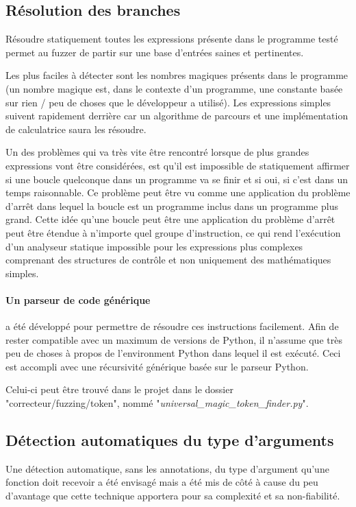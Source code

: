 \documentclass[a4paper]{report}
\begin{document}
\subsection{Résolution des branches}

Résoudre statiquement toutes les expressions présente dans le programme testé permet au fuzzer de partir sur une base d'entrées saines et pertinentes.

Les plus faciles à détecter sont les nombres magiques présents dans le programme (un nombre magique est, dans le contexte d'un programme, une constante basée sur rien / peu de choses que le développeur a utilisé).
Les expressions simples suivent rapidement derrière car un algorithme de parcours et une implémentation de calculatrice saura les résoudre.

Un des problèmes qui va très vite être rencontré lorsque de plus grandes expressions vont être considérées, est qu'il est impossible de statiquement affirmer si une boucle quelconque dans un programme va se finir et si oui, si c'est dans un temps raisonnable.
Ce problème peut être vu comme une application du problème d'arrêt \cite{burkholder1987halting} dans lequel la boucle est un programme inclus dans un programme plus grand.
Cette idée qu'une boucle peut être une application du problème d'arrêt peut être étendue à n'importe quel groupe d'instruction, ce qui rend l'exécution d'un analyseur statique impossible pour les expressions plus complexes comprenant des structures de contrôle et non uniquement des mathématiques simples.

\paragraph{Un parseur de code générique} a été développé pour permettre de résoudre ces instructions facilement.
Afin de rester compatible avec un maximum de versions de Python, il n'assume que très peu de choses à propos de l'environment Python dans lequel il est exécuté.
Ceci est accompli avec une récursivité générique basée sur le parseur Python.

Celui-ci peut être trouvé dans le projet dans le dossier "correcteur/fuzzing/token", nommé "\textit{universal\_magic\_token\_finder.py}".   


\subsection{Détection automatiques du type d'arguments}
Une détection automatique, sans les annotations, du type d'argument qu'une fonction doit recevoir a été envisagé mais a été mis de côté à cause du peu d'avantage que cette technique apportera pour sa complexité et sa non-fiabilité.
\end{document}
